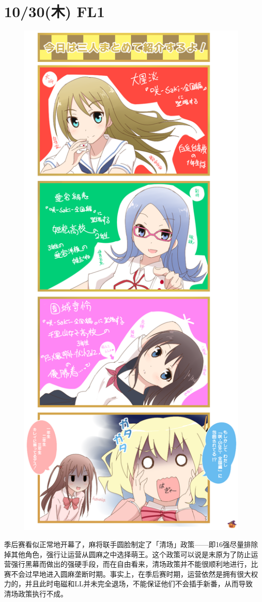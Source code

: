 \newpage

\section{10/30(木) FL1}


\begin{figure}
  \includegraphics[width=.45\textwidth]{images/u6566.png}
\end{figure}

季后赛看似正常地开幕了，麻将联手圆脸制定了「清场」政策——即16强尽量排除掉其他角色，强行让运营从圆麻之中选择萌王。这个政策可以说是末原为了防止运营强行黑幕而做出的强硬手段，而在自由看来，清场政策并不能很顺利地进行，比赛不会过早地进入圆麻垄断时期。事实上，在季后赛时期，运营依然是拥有很大权力的，并且此时电磁和LL并未完全退场，不能保证他们不会插手新番，从而导致清场政策执行不成。

